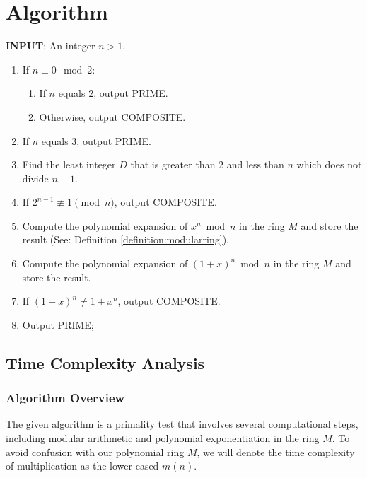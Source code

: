 \documentclass{article}
\theoremstyle{plain}
\theoremstyle{definition}
\newcommand{\Mx}{M}
\begin{document}
\section{Algorithm} \label{section:algorithm}
\textbf{INPUT}: An integer $n > 1$.
\begin{center}
    \begin{enumerate}
        \item If $n \equiv 0 \mod{2}$:
            \begin{enumerate}
                \item If $n$ equals $2$, output PRIME.
                \item Otherwise, output COMPOSITE.
            \end{enumerate}
        \item If $n$ equals $3$, output PRIME.
        \item Find the least integer $D$ that is greater than $2$ and less than $n$ which does not divide $n-1$.
        \item If $2^{n-1} \not\equiv 1 \pmod{n}$, output COMPOSITE.
        \item Compute the polynomial expansion of $x^n \bmod{n}$ in the ring $\Mx$ and store the result (See: Definition \ref{definition:modularring}).
        \item Compute the polynomial expansion of $(1 + x)^n \bmod{n}$ in the ring $\Mx$ and store the result.
        \item If $(1 + x)^n \not= 1 + x^n$, output COMPOSITE.
        \item Output PRIME;
    \end{enumerate}
\end{center}

\subsection{Time Complexity Analysis} \label{subsection:timecomplexity}

\subsubsection{Algorithm Overview}
The given algorithm is a primality test that involves several computational steps, including modular arithmetic and polynomial exponentiation in the ring $\Mx$. To avoid confusion with our polynomial ring $\Mx$, we will denote the time complexity of multiplication as the lower-cased $m(n)$.
\end{document}
